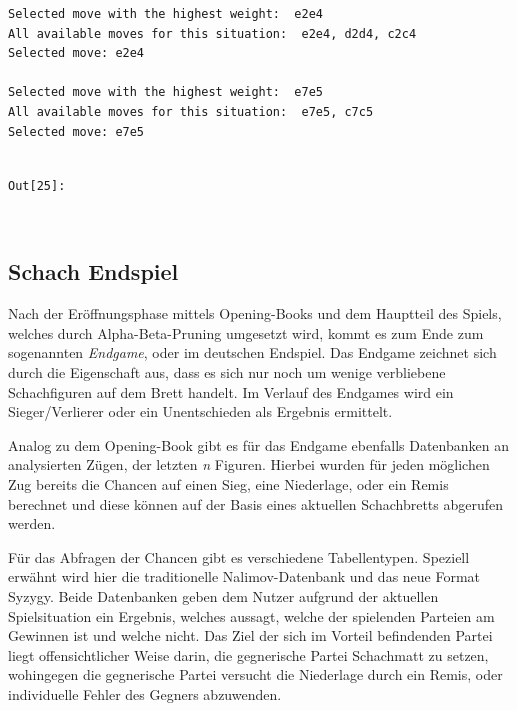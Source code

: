     \begin{Verbatim}[commandchars=\\\{\}]
Selected move with the highest weight:  e2e4
All available moves for this situation:  e2e4, d2d4, c2c4
Selected move: e2e4

Selected move with the highest weight:  e7e5
All available moves for this situation:  e7e5, c7c5
Selected move: e7e5


    \end{Verbatim}
\texttt{\color{outcolor}Out[{\color{outcolor}25}]:}
    
    \begin{center}
    \end{center}
    { \hspace*{\fill} \\}
    

    \subsection{Schach Endspiel}\label{chess-endgame}

Nach der Eröffnungsphase mittels Opening-Books und dem Hauptteil des
Spiels, welches durch Alpha-Beta-Pruning umgesetzt wird, kommt es zum
Ende zum sogenannten \emph{Endgame}, oder im deutschen Endspiel. Das
Endgame zeichnet sich durch die Eigenschaft aus, dass es sich nur noch
um wenige verbliebene Schachfiguren auf dem Brett handelt. Im Verlauf
des Endgames wird ein Sieger/Verlierer oder ein Unentschieden als
Ergebnis ermittelt.

Analog zu dem Opening-Book gibt es für das Endgame ebenfalls Datenbanken
an analysierten Zügen, der letzten \emph{n} Figuren. Hierbei wurden für
jeden möglichen Zug bereits die Chancen auf einen Sieg, eine Niederlage,
oder ein Remis berechnet und diese können auf der Basis eines aktuellen
Schachbretts abgerufen werden.

Für das Abfragen der Chancen gibt es verschiedene Tabellentypen.
Speziell erwähnt wird hier die traditionelle Nalimov-Datenbank\cite{Chessprogramming.org2019} und das
neue Format Syzygy\cite{Chessprogramming.org2019a}. Beide Datenbanken geben dem Nutzer aufgrund der
aktuellen Spielsituation ein Ergebnis, welches aussagt, welche der
spielenden Parteien am Gewinnen ist und welche nicht. Das Ziel der sich
im Vorteil befindenden Partei liegt offensichtlicher Weise darin, die
gegnerische Partei Schachmatt zu setzen, wohingegen die gegnerische
Partei versucht die Niederlage durch ein Remis, oder individuelle Fehler
des Gegners abzuwenden.


